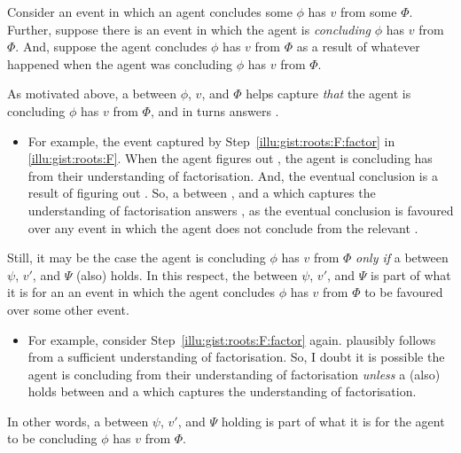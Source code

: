 \begin{note}
  Consider an event in which an agent concludes some  \(\phi\) has \val{} \(v\) from some \pool{} \(\Phi\).
  Further, suppose there is an event in which the agent is \emph{concluding} \(\phi\) has \val{} \(v\) from \(\Phi\).
  And, suppose the agent concludes \(\phi\) has \val{} \(v\) from \(\Phi\) as a result of whatever happened when the agent was concluding \(\phi\) has \val{} \(v\) from \(\Phi\).

  As motivated above, a \ros{} between \(\phi\), \(v\), and \(\Phi\) helps capture \emph{that} the agent is concluding \(\phi\) has  \(v\) from \(\Phi\), and in turns answers \qWhy{}.
  \begin{itemize}
  \item
    For example, the event captured by Step~\ref{illu:gist:roots:F:factor} in \autoref{illu:gist:roots:F}.
    When the agent figures out \rootsConEqFac{}, the agent is concluding \propI{\rootsCon{}} has   from their understanding of factorisation.
    And, the eventual conclusion is a result of figuring out \rootsConEqFac{}.
    So, a \ros{} between , and a \pool{} which captures the \agents{} understanding of factorisation answers \qWhy{}, as the \agents{} eventual conclusion is favoured over any event in which the agent does not conclude  from the relevant \pool{}.
  \end{itemize}
  Still, it may be the case the agent is concluding \(\phi\) has  \(v\) from \(\Phi\) \emph{only if} a \ros{} between \(\psi\), \(v'\), and \(\Psi\) (also) holds.
  In this respect, the \ros{} between \(\psi\), \(v'\), and \(\Psi\) is part of what it is for an an event in which the agent concludes \(\phi\) has  \(v\) from \(\Phi\) to be favoured over some other event.
  \begin{itemize}
  \item
    For example, consider Step~\ref{illu:gist:roots:F:factor} again.
     plausibly follows from a sufficient understanding of factorisation.
    So, I doubt it is possible the agent is concluding  from their understanding of factorisation \emph{unless} a \ros{} (also) holds between  and a \pool{} which captures the \agents{} understanding of factorisation.
  \end{itemize}
  In other words, a \ros{} between \(\psi\), \(v'\), and \(\Psi\) holding is part of what it is for the agent to be concluding \(\phi\) has  \(v\) from \(\Phi\).

\end{note}

